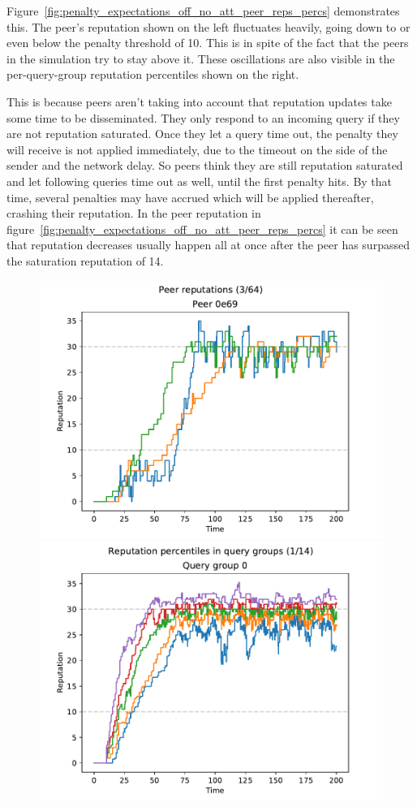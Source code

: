 Figure~\ref{fig:penalty_expectations_off_no_att_peer_reps_percs} demonstrates
this. The peer's reputation shown on the left fluctuates heavily, going down to
or even below the penalty threshold of 10. This is in spite of the fact that the
peers in the simulation try to stay above it. These oscillations are also
visible in the per-query-group reputation percentiles shown on the right.

This is because peers aren't taking into account that reputation updates take
some time to be disseminated. They only respond to an incoming query if they are
not reputation saturated. Once they let a query time out, the penalty they will
receive is not applied immediately, due to the timeout on the side of the sender
and the network delay. So peers think they are still reputation saturated and
let following queries time out as well, until the first penalty hits. By that
time, several penalties may have accrued which will be applied thereafter,
crashing their reputation. In the peer reputation in
figure~\ref{fig:penalty_expectations_off_no_att_peer_reps_percs} it can be seen
that reputation decreases usually happen all at once after the peer has
surpassed the saturation reputation of 14.

\begin{figure}[t]
\centering
\includegraphics[width=0.5\columnwidth]{figures/expectations_off_no_att_high_buf_peer_reps_3_of_64}%
\includegraphics[width=0.5\columnwidth]{figures/expectations_off_no_att_high_buf_rep_percs_1_of_14}
\label{fig:penalty_expectations_off_no_att_high_buf_peer_reps_percs}
\end{figure}

